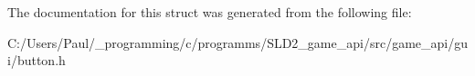 The documentation for this struct was generated from the following file\+:\begin{DoxyCompactItemize}
\item 
C\+:/\+Users/\+Paul/\+\_\+programming/c/programms/\+S\+L\+D2\+\_\+game\+\_\+api/src/game\+\_\+api/gui/button.\+h\end{DoxyCompactItemize}

